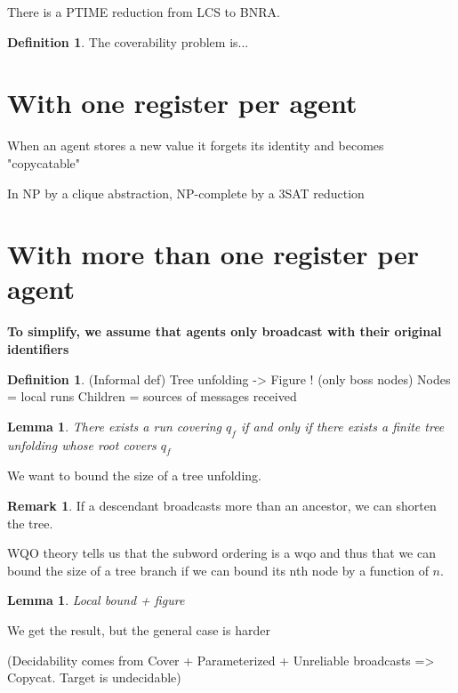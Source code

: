 \documentclass{article}
\newtheorem{lemma}[theorem]{Lemma}
\theoremstyle{definition}
\newtheorem{definition}[theorem]{Definition}
\newtheorem{remark}{Remark}
\begin{document}
	\begin{theorem}
		There is a PTIME reduction from LCS to BNRA.
	\end{theorem}
	
	\begin{definition}
		The coverability problem is...
	\end{definition}
	
	\section{With one register per agent}
	
	When an agent stores a new value it forgets its identity and becomes "copycatable"
	
	In NP by a clique abstraction, NP-complete by a 3SAT reduction
	
	\section{With more than one register per agent}
	
	\textbf{To simplify, we assume that agents only broadcast with their original identifiers}
	
	\begin{definition}
		(Informal def) Tree unfolding -> Figure ! (only boss nodes)
		Nodes = local runs
		Children = sources of messages received
	\end{definition} 
	
	\begin{lemma}
		There exists a run covering $q_f$ if and only if there exists a finite tree unfolding whose root covers $q_f$
	\end{lemma}
	
	We want to bound the size of a tree unfolding.
	
	\begin{remark}
		If a descendant broadcasts more than an ancestor, we can shorten the tree.
	\end{remark}
	
	WQO theory tells us that the subword ordering is a wqo and thus that we can bound the size of a tree branch if we can bound its nth node by a function of $n$.
	
	\begin{lemma}
		Local bound + figure
	\end{lemma}
	
	We get the result, but the general case is harder
	
	(Decidability comes from Cover + Parameterized +  Unreliable broadcasts => Copycat. Target is undecidable)
	
\end{document}
